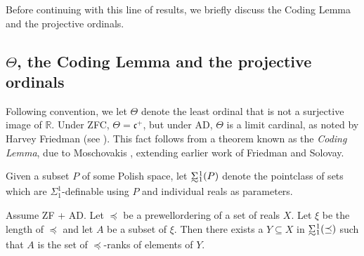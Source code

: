 \documentclass{book}%
\newcommand{\breals}{{^{\omega}}\omega}
\def\underTilde#1{{\baselineskip=0pt\vtop{\hbox{$#1$}\hbox{$\sim$}}}{}}
\def\undertilde#1{{\baselineskip=0pt\vtop
  {\hbox{$#1$}\hbox{$\scriptscriptstyle\sim$}}}{}}
\newcommand{\uTSigma}{\underTilde{\Sigma}}
\newcommand{\utdelta}{\undertilde{\delta}}
\begin{document}

Before continuing with this line of results, we briefly discuss the Coding Lemma and the projective ordinals.


\subsection{$\Theta$, the Coding Lemma and the projective ordinals}\label{thetaprojo}

Following convention, we let $\Theta$\index{$\Theta$} denote the least ordinal that
is not a surjective image of $\mathbb{R}$. Under ZFC, $\Theta = \mathfrak{c}^{+}$, but under AD, $\Theta$ is a
limit cardinal, as noted by Harvey Friedman (see \cite[p.~398]{Kanamori}).
This fact follows from a
theorem known as the \emph{Coding Lemma}, due to
Moschovakis , extending earlier work of
Friedman and Solovay.

Given a subset $P$ of some Polish space, let $\uTSigma^{1}_{1}(P)$ denote the
pointclass of sets which are $\Sigma^{1}_{1}$-definable using $P$
and individual reals as parameters.


\begin{theorem} Assume {\rm ZF + AD}. Let $\preceq$ be a prewellordering of a set of reals $X$. Let $\xi$ be the length
of $\preceq$ and let $A$ be a subset of $\xi$. Then there exists a
$Y \subseteq X$ in $\uTSigma^{1}_{1}(\preceq)$ such that $A$ is
the set of $\preceq$-ranks of elements of $Y$.
\end{theorem}
\end{document}

